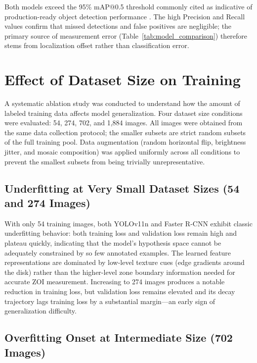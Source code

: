 Both models exceed the 95\% mAP@0.5 threshold commonly cited as indicative of
production-ready object detection performance \cite{ren2015faster}.
The high Precision and Recall values confirm that missed detections and false positives
are negligible; the primary source of measurement error (Table~\ref{tab:model_comparison})
therefore stems from localization offset rather than classification error.

\section{Effect of Dataset Size on Training}
\label{sec:dataset_size}

A systematic ablation study was conducted to understand how the amount of labeled training data
affects model generalization.
Four dataset size conditions were evaluated: 54, 274, 702, and 1,884 images.
All images were obtained from the same data collection protocol;
the smaller subsets are strict random subsets of the full training pool.
Data augmentation (random horizontal flip, brightness jitter, and mosaic composition)
was applied uniformly across all conditions to prevent the smallest subsets
from being trivially unrepresentative.

\subsection{Underfitting at Very Small Dataset Sizes (54 and 274 Images)}

With only 54 training images, both YOLOv11n and Faster R-CNN exhibit classic underfitting behavior:
both training loss and validation loss remain high and plateau quickly,
indicating that the model's hypothesis space cannot be adequately constrained
by so few annotated examples.
The learned feature representations are dominated by low-level texture cues
(edge gradients around the disk) rather than the higher-level zone boundary information
needed for accurate ZOI measurement.
Increasing to 274 images produces a notable reduction in training loss,
but validation loss remains elevated and its decay trajectory lags training loss by a
substantial margin---an early sign of generalization difficulty.

\subsection{Overfitting Onset at Intermediate Size (702 Images)}

